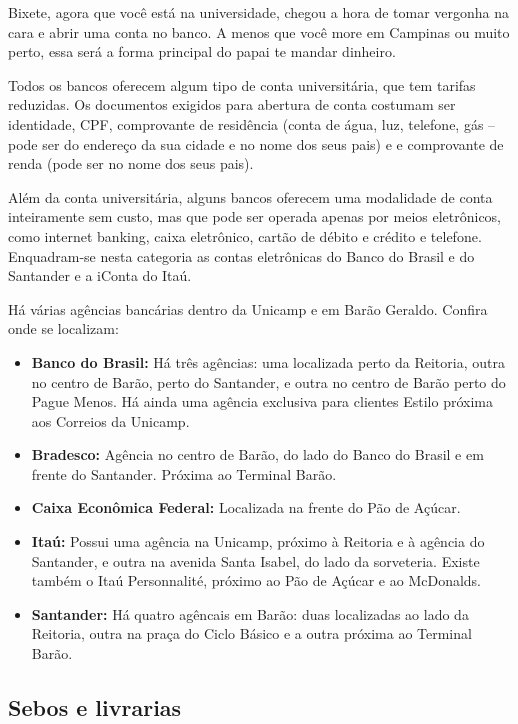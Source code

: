 Bixete, agora que você está na universidade, chegou a hora de tomar vergonha na
cara e abrir uma conta no banco. A menos que você more em Campinas ou muito
perto, essa será a forma principal do papai te mandar dinheiro.

Todos os bancos oferecem algum tipo de conta universitária, que tem tarifas
reduzidas. Os documentos exigidos para abertura de conta costumam ser
identidade, CPF, comprovante de residência (conta de água, luz, telefone, gás
-- pode ser do endereço da sua cidade e no nome dos seus pais) e e comprovante
de renda (pode ser no nome dos seus pais).

Além da conta universitária, alguns bancos oferecem uma modalidade de conta
inteiramente sem custo, mas que pode ser operada apenas por meios eletrônicos,
como internet banking, caixa eletrônico, cartão de débito e crédito e telefone.
Enquadram-se nesta categoria as contas eletrônicas do Banco do Brasil e do
Santander e a iConta do Itaú.

Há várias agências bancárias dentro da Unicamp e em Barão Geraldo. Confira onde
se localizam:

\begin{itemize}
\item \textbf{Banco do Brasil:} Há três agências: uma localizada perto da
  Reitoria, outra no centro de Barão, perto do Santander, e outra no centro de
  Barão perto do Pague Menos. Há ainda uma agência exclusiva para clientes
  Estilo próxima aos Correios da Unicamp.

\item \textbf{Bradesco:} Agência no centro de Barão, do lado do Banco do Brasil
  e em frente do Santander. Próxima ao Terminal Barão.

\item \textbf{Caixa Econômica Federal:} Localizada na frente do Pão de Açúcar.

\item \textbf{Itaú:} Possui uma agência na Unicamp, próximo à Reitoria e à
  agência do Santander, e outra na avenida Santa Isabel, do lado da sorveteria.
  Existe também o Itaú Personnalité, próximo ao Pão de Açúcar e ao McDonalds.

\item \textbf{Santander:} Há quatro agêncais em Barão: duas localizadas ao lado
  da Reitoria, outra na praça do Ciclo Básico e a outra próxima ao Terminal
  Barão.
\end{itemize}

\subsection{Sebos e livrarias}


